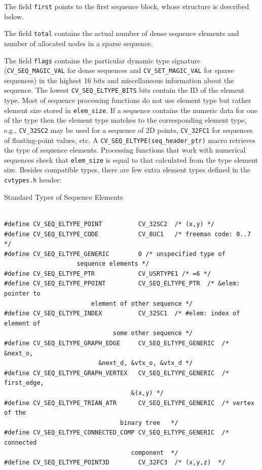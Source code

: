 The field \texttt{first} points to the first sequence block, whose structure is described below.

The field \texttt{total} contains the actual number of dense sequence elements and number of allocated nodes in a sparse sequence.

The field \texttt{flags} contains the particular dynamic type
signature (\texttt{CV\_SEQ\_MAGIC\_VAL} for dense sequences and
\texttt{CV\_SET\_MAGIC\_VAL} for sparse sequences) in the highest 16
bits and miscellaneous information about the sequence. The lowest
\texttt{CV\_SEQ\_ELTYPE\_BITS} bits contain the ID of the element
type. Most of sequence processing functions do not use element type but rather
element size stored in \texttt{elem\_size}. If a sequence contains the
numeric data for one of the  type then the element type matches
to the corresponding  element type, e.g., \texttt{CV\_32SC2} may be
used for a sequence of 2D points, \texttt{CV\_32FC1} for sequences of floating-point
values, etc. A \texttt{CV\_SEQ\_ELTYPE(seq\_header\_ptr)} macro retrieves the
type of sequence elements. Processing functions that work with numerical
sequences check that \texttt{elem\_size} is equal to that calculated from
the type element size. Besides  compatible types, there
are few extra element types defined in the \texttt{cvtypes.h} header:

Standard Types of Sequence Elements

\begin{lstlisting}

#define CV_SEQ_ELTYPE_POINT          CV_32SC2  /* (x,y) */
#define CV_SEQ_ELTYPE_CODE           CV_8UC1   /* freeman code: 0..7 */
#define CV_SEQ_ELTYPE_GENERIC        0 /* unspecified type of 
					sequence elements */
#define CV_SEQ_ELTYPE_PTR            CV_USRTYPE1 /* =6 */
#define CV_SEQ_ELTYPE_PPOINT         CV_SEQ_ELTYPE_PTR  /* &elem: pointer to 
						element of other sequence */
#define CV_SEQ_ELTYPE_INDEX          CV_32SC1  /* #elem: index of element of 
						      some other sequence */
#define CV_SEQ_ELTYPE_GRAPH_EDGE     CV_SEQ_ELTYPE_GENERIC  /* &next_o, 
						  &next_d, &vtx_o, &vtx_d */
#define CV_SEQ_ELTYPE_GRAPH_VERTEX   CV_SEQ_ELTYPE_GENERIC  /* first_edge, 
								   &(x,y) */
#define CV_SEQ_ELTYPE_TRIAN_ATR      CV_SEQ_ELTYPE_GENERIC  /* vertex of the 
							    binary tree   */
#define CV_SEQ_ELTYPE_CONNECTED_COMP CV_SEQ_ELTYPE_GENERIC  /* connected 
							       component  */
#define CV_SEQ_ELTYPE_POINT3D        CV_32FC3  /* (x,y,z)  */

\end{lstlisting}

